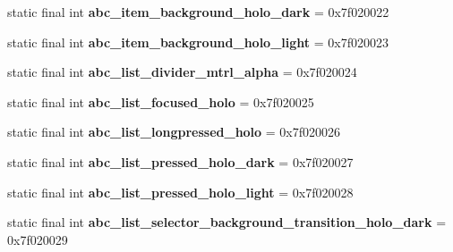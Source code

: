 \begin{DoxyCompactItemize}
\item 
\hypertarget{classandroid_1_1support_1_1design_1_1_r_1_1drawable_a7b733f9057a2cff89be485f9cd6928d5}{}static final int {\bfseries abc\+\_\+item\+\_\+background\+\_\+holo\+\_\+dark} = 0x7f020022\label{classandroid_1_1support_1_1design_1_1_r_1_1drawable_a7b733f9057a2cff89be485f9cd6928d5}

\item 
\hypertarget{classandroid_1_1support_1_1design_1_1_r_1_1drawable_a43f7ea0b127c030b4e1a667243515c79}{}static final int {\bfseries abc\+\_\+item\+\_\+background\+\_\+holo\+\_\+light} = 0x7f020023\label{classandroid_1_1support_1_1design_1_1_r_1_1drawable_a43f7ea0b127c030b4e1a667243515c79}

\item 
\hypertarget{classandroid_1_1support_1_1design_1_1_r_1_1drawable_abb445bd8a123081407a9b597f769ad61}{}static final int {\bfseries abc\+\_\+list\+\_\+divider\+\_\+mtrl\+\_\+alpha} = 0x7f020024\label{classandroid_1_1support_1_1design_1_1_r_1_1drawable_abb445bd8a123081407a9b597f769ad61}

\item 
\hypertarget{classandroid_1_1support_1_1design_1_1_r_1_1drawable_a1d26c3d76e535036aa21aa917a88cb4e}{}static final int {\bfseries abc\+\_\+list\+\_\+focused\+\_\+holo} = 0x7f020025\label{classandroid_1_1support_1_1design_1_1_r_1_1drawable_a1d26c3d76e535036aa21aa917a88cb4e}

\item 
\hypertarget{classandroid_1_1support_1_1design_1_1_r_1_1drawable_aacb9ee6a5ba24e73df7340a9e8f73314}{}static final int {\bfseries abc\+\_\+list\+\_\+longpressed\+\_\+holo} = 0x7f020026\label{classandroid_1_1support_1_1design_1_1_r_1_1drawable_aacb9ee6a5ba24e73df7340a9e8f73314}

\item 
\hypertarget{classandroid_1_1support_1_1design_1_1_r_1_1drawable_ab1e6fcec42423709d799d8f6a7e21059}{}static final int {\bfseries abc\+\_\+list\+\_\+pressed\+\_\+holo\+\_\+dark} = 0x7f020027\label{classandroid_1_1support_1_1design_1_1_r_1_1drawable_ab1e6fcec42423709d799d8f6a7e21059}

\item 
\hypertarget{classandroid_1_1support_1_1design_1_1_r_1_1drawable_ab0cef3e2b1fc7aa0bf2c1988bfeaca30}{}static final int {\bfseries abc\+\_\+list\+\_\+pressed\+\_\+holo\+\_\+light} = 0x7f020028\label{classandroid_1_1support_1_1design_1_1_r_1_1drawable_ab0cef3e2b1fc7aa0bf2c1988bfeaca30}

\item 
\hypertarget{classandroid_1_1support_1_1design_1_1_r_1_1drawable_a7f756d25e913e1c3d2bd87d82265fb46}{}static final int {\bfseries abc\+\_\+list\+\_\+selector\+\_\+background\+\_\+transition\+\_\+holo\+\_\+dark} = 0x7f020029\label{classandroid_1_1support_1_1design_1_1_r_1_1drawable_a7f756d25e913e1c3d2bd87d82265fb46}


\end{DoxyCompactItemize}
